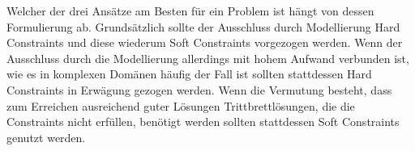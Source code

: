 
Welcher der drei Ansätze am Besten für ein Problem ist hängt von dessen Formulierung ab.
Grundsätzlich sollte der Ausschluss durch Modellierung Hard Constraints und diese wiederum Soft Constraints vorgezogen werden.
Wenn der Ausschluss durch die Modellierung allerdings mit hohem Aufwand verbunden ist, wie es in komplexen Domänen häufig der Fall ist sollten stattdessen Hard Constraints in Erwägung gezogen werden.
Wenn die Vermutung besteht, dass zum Erreichen ausreichend guter Lösungen Trittbrettlösungen, die die Constraints nicht erfüllen, benötigt werden sollten stattdessen Soft Constraints genutzt werden.

